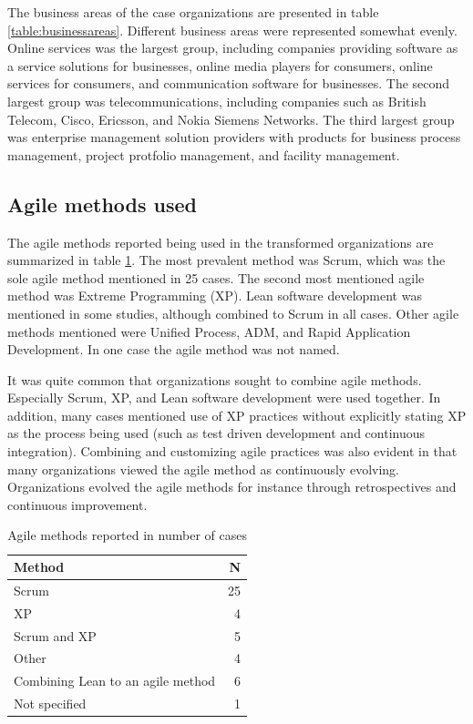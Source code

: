\documentclass[preprint,authoryear,12pt]{elsarticle}
\begin{document}
The business areas of the case organizations are presented in table
\ref{table:businessareas}. Different business areas were represented somewhat
evenly. Online services was the largest group, including companies
providing software as a service solutions for businesses, online media players
for consumers, online services for consumers, and communication software for
businesses. The second largest group was telecommunications, including companies
such as British Telecom, Cisco, Ericsson, and Nokia Siemens Networks. The third
largest group was enterprise management solution providers with products for
business process management, project protfolio management, and facility
management.


\subsection{Agile methods used}

The agile methods reported being used in the transformed organizations are
summarized in table \ref{table:agilemethods}. The most prevalent method was
Scrum, which was the sole agile method mentioned in 25 cases. The second most
mentioned agile method was Extreme Programming (XP). Lean software development
was mentioned in some studies, although combined to Scrum in all cases. Other
agile methods mentioned were Unified Process, ADM, and Rapid Application
Development. In one case the agile method was not named.

It was quite common that organizations sought to combine agile methods.
Especially Scrum, XP, and Lean software development were used together. In
addition, many cases mentioned use of XP practices without explicitly stating XP
as the process being used (such as test driven development and continuous
integration). Combining and customizing agile practices was also evident in that
many organizations viewed the agile method as continuously evolving.
Organizations evolved the agile methods for instance through retrospectives and
continuous improvement.

\begin{table}[t]
    \begin{tabular}{ l r }
        \toprule
        Method                             &  N  \\
        \midrule
        Scrum                              &  25 \\
        XP                                 &  4  \\
        Scrum and XP                       &  5  \\
        Other                              &  4  \\
        Combining Lean to an agile method  &  6  \\
        Not specified                      &  1  \\
        \bottomrule
    \end{tabular}
    \caption{Agile methods reported in number of cases}
    \label{table:agilemethods}
\end{table}
\end{document}
